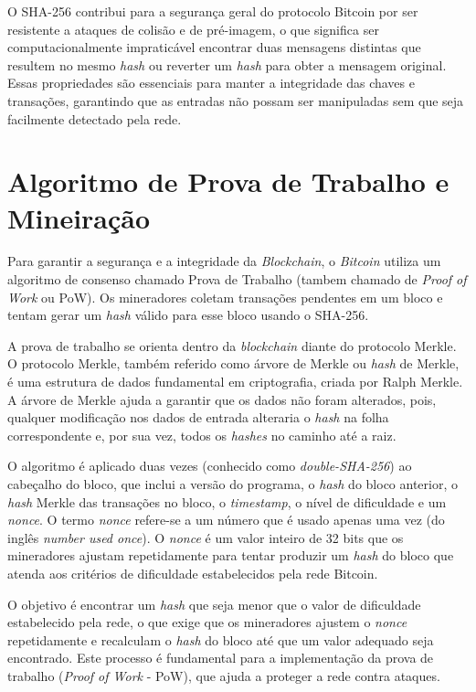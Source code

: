 O SHA-256 contribui para a segurança geral do protocolo Bitcoin por ser resistente a ataques de colisão e de pré-imagem, o que significa ser computacionalmente impraticável encontrar duas mensagens distintas que resultem no mesmo \textit{hash} ou reverter um \textit{hash} para obter a mensagem original. Essas propriedades são essenciais para manter a integridade das chaves e transações, garantindo que as entradas não possam ser manipuladas sem que seja facilmente detectado pela rede.

\section*{Algoritmo de Prova de Trabalho e Mineiração} \label{subsec:pow}
Para garantir a segurança e a integridade da \textit{Blockchain}, o \textit{Bitcoin} utiliza um algoritmo de consenso chamado Prova de Trabalho (tambem chamado de \textit{Proof of Work} ou PoW). Os mineradores coletam transações pendentes em um bloco e tentam gerar um \textit{hash} válido para esse bloco usando o SHA-256.

A prova de trabalho se orienta dentro da \textit{blockchain} diante do protocolo Merkle. O protocolo Merkle, também referido como árvore de Merkle ou \textit{hash} de Merkle, é uma estrutura de dados fundamental em criptografia, criada por Ralph Merkle. A árvore de Merkle ajuda a garantir que os dados não foram alterados, pois, qualquer modificação nos dados de entrada alteraria o \textit{hash} na folha correspondente e, por sua vez, todos os \textit{hashes} no caminho até a raiz.


O algoritmo é aplicado duas vezes (conhecido como \textit{double-SHA-256}) ao cabeçalho do bloco, que inclui a versão do programa, o \textit{hash} do bloco anterior, o \textit{hash} Merkle das transações no bloco, o \textit{timestamp}, o nível de dificuldade e um \textit{nonce}. O termo \textit{nonce} refere-se a um número que é usado apenas uma vez (do inglês \textit{number used once}). O \textit{nonce} é um valor inteiro de 32 bits que os mineradores ajustam repetidamente para tentar produzir um \textit{hash} do bloco que atenda aos critérios de dificuldade estabelecidos pela rede Bitcoin.

O objetivo é encontrar um \textit{hash} que seja menor que o valor de dificuldade estabelecido pela rede, o que exige que os mineradores ajustem o \textit{nonce} repetidamente e recalculam o \textit{hash} do bloco até que um valor adequado seja encontrado. Este processo é fundamental para a implementação da prova de trabalho (\textit{Proof of Work} - PoW), que ajuda a proteger a rede contra ataques.

